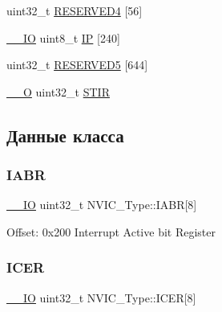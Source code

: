 \begin{DoxyCompactItemize}
\item 
uint32\+\_\+t \mbox{\hyperlink{struct_n_v_i_c___type_a5c0e5d507ac3c1bd5cdaaf9bbd177790}{R\+E\+S\+E\+R\+V\+E\+D4}} \mbox{[}56\mbox{]}
\item 
\mbox{\hyperlink{group___c_m_s_i_s___c_m3__core__definitions_gaec43007d9998a0a0e01faede4133d6be}{\+\_\+\+\_\+\+IO}} uint8\+\_\+t \mbox{\hyperlink{struct_n_v_i_c___type_a6524789fedb94623822c3e0a47f3d06c}{IP}} \mbox{[}240\mbox{]}
\item 
uint32\+\_\+t \mbox{\hyperlink{struct_n_v_i_c___type_a4f753b4f824270175af045ac99bc12e8}{R\+E\+S\+E\+R\+V\+E\+D5}} \mbox{[}644\mbox{]}
\item 
\mbox{\hyperlink{group___c_m_s_i_s___c_m3__core__definitions_ga7e25d9380f9ef903923964322e71f2f6}{\+\_\+\+\_\+O}} uint32\+\_\+t \mbox{\hyperlink{struct_n_v_i_c___type_a0b0d7f3131da89c659a2580249432749}{S\+T\+IR}}
\end{DoxyCompactItemize}


\subsection{Данные класса}
\mbox{\label{struct_n_v_i_c___type_a33e917b381e08dabe4aa5eb2881a7c11}} 
\subsubsection{\texorpdfstring{IABR}{IABR}}
{\footnotesize\ttfamily \mbox{\hyperlink{group___c_m_s_i_s___c_m3__core__definitions_gaec43007d9998a0a0e01faede4133d6be}{\+\_\+\+\_\+\+IO}} uint32\+\_\+t N\+V\+I\+C\+\_\+\+Type\+::\+I\+A\+BR\mbox{[}8\mbox{]}}

Offset\+: 0x200 Interrupt Active bit Register ~\newline
 \mbox{\label{struct_n_v_i_c___type_a1965a2e68b61d2e2009621f6949211a5}} 
\subsubsection{\texorpdfstring{ICER}{ICER}}
{\footnotesize\ttfamily \mbox{\hyperlink{group___c_m_s_i_s___c_m3__core__definitions_gaec43007d9998a0a0e01faede4133d6be}{\+\_\+\+\_\+\+IO}} uint32\+\_\+t N\+V\+I\+C\+\_\+\+Type\+::\+I\+C\+ER\mbox{[}8\mbox{]}}

